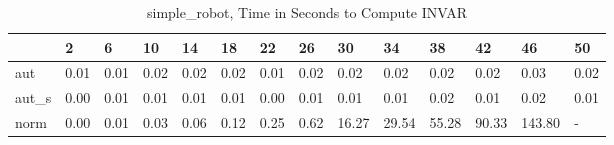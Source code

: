 \begin{table}
\caption{simple_robot, Time in Seconds to Compute INVAR}
\label{simple_robot_INVAR_time}
\begin{tabular}{llllllllllllll}
\toprule
 & 2 & 6 & 10 & 14 & 18 & 22 & 26 & 30 & 34 & 38 & 42 & 46 & 50 \\
\midrule
aut & 0.01 & 0.01 & 0.02 & 0.02 & 0.02 & 0.01 & 0.02 & 0.02 & 0.02 & 0.02 & 0.02 & 0.03 & 0.02 \\
aut_s & 0.00 & 0.01 & 0.01 & 0.01 & 0.01 & 0.00 & 0.01 & 0.01 & 0.01 & 0.02 & 0.01 & 0.02 & 0.01 \\
norm & 0.00 & 0.01 & 0.03 & 0.06 & 0.12 & 0.25 & 0.62 & 16.27 & 29.54 & 55.28 & 90.33 & 143.80 & - \\
\bottomrule
\end{tabular}
\end{table}
